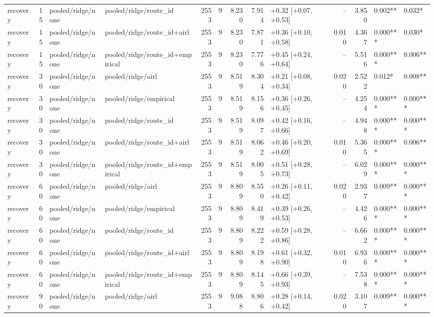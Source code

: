 \begin{tabular}{lrllrrrrlrrll}
recovery & 15 & pooled/ridge/none & pooled/ridge/route_id & 2553 & 9 & 8.230 & 7.914 & +0.32 [+0.07, +0.53] & -- & 3.850 & 0.002** & 0.032* \\
recovery & 15 & pooled/ridge/none & pooled/ridge/route_id+airl & 2553 & 9 & 8.230 & 7.871 & +0.36 [+0.10, +0.58] & 0.010 & 4.367 & 0.000*** & 0.030* \\
recovery & 15 & pooled/ridge/none & pooled/ridge/route_id+empirical & 2553 & 9 & 8.230 & 7.776 & +0.45 [+0.24, +0.64] & -- & 5.516 & 0.000*** & 0.006** \\
recovery & 30 & pooled/ridge/none & pooled/ridge/airl & 2553 & 9 & 8.519 & 8.304 & +0.21 [+0.08, +0.34] & 0.020 & 2.522 & 0.012* & 0.008** \\
recovery & 30 & pooled/ridge/none & pooled/ridge/empirical & 2553 & 9 & 8.519 & 8.156 & +0.36 [+0.26, +0.45] & -- & 4.254 & 0.000*** & 0.000*** \\
recovery & 30 & pooled/ridge/none & pooled/ridge/route_id & 2553 & 9 & 8.519 & 8.097 & +0.42 [+0.16, +0.66] & -- & 4.948 & 0.000*** & 0.000*** \\
recovery & 30 & pooled/ridge/none & pooled/ridge/route_id+airl & 2553 & 9 & 8.519 & 8.062 & +0.46 [+0.20, +0.69] & 0.010 & 5.365 & 0.000*** & 0.006** \\
recovery & 30 & pooled/ridge/none & pooled/ridge/route_id+empirical & 2553 & 9 & 8.519 & 8.005 & +0.51 [+0.28, +0.73] & -- & 6.029 & 0.000*** & 0.000*** \\
recovery & 60 & pooled/ridge/none & pooled/ridge/airl & 2553 & 9 & 8.809 & 8.550 & +0.26 [+0.11, +0.42] & 0.020 & 2.937 & 0.009** & 0.000*** \\
recovery & 60 & pooled/ridge/none & pooled/ridge/empirical & 2553 & 9 & 8.809 & 8.419 & +0.39 [+0.26, +0.53] & -- & 4.426 & 0.000*** & 0.000*** \\
recovery & 60 & pooled/ridge/none & pooled/ridge/route_id & 2553 & 9 & 8.809 & 8.222 & +0.59 [+0.28, +0.86] & -- & 6.662 & 0.000*** & 0.000*** \\
recovery & 60 & pooled/ridge/none & pooled/ridge/route_id+airl & 2553 & 9 & 8.809 & 8.198 & +0.61 [+0.32, +0.90] & 0.010 & 6.936 & 0.000*** & 0.000*** \\
recovery & 60 & pooled/ridge/none & pooled/ridge/route_id+empirical & 2553 & 9 & 8.809 & 8.145 & +0.66 [+0.39, +0.93] & -- & 7.538 & 0.000*** & 0.000*** \\
recovery & 90 & pooled/ridge/none & pooled/ridge/airl & 2553 & 9 & 9.088 & 8.806 & +0.28 [+0.14, +0.42] & 0.020 & 3.107 & 0.009** & 0.000*** \\

\end{tabular}
